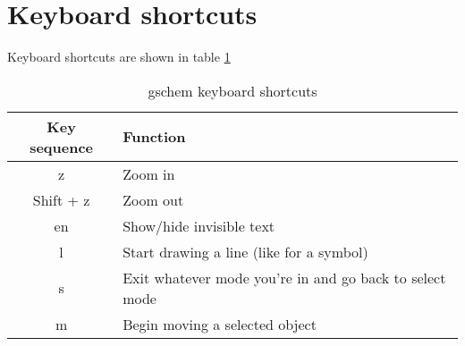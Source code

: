 \section{Keyboard shortcuts}
Keyboard shortcuts are shown in table \ref{shortcuts}

\begin{table}[h]
\begin{center}
\setlength{\extrarowheight}{0.5cm}
\begin{tabular}{cl}

Key sequence	&Function\\
\hline
z		&Zoom in\\
Shift + z	&Zoom out\\
en		&Show/hide invisible text\\
l		&Start drawing a line (like for a symbol)\\
s		&Exit whatever mode you're in and go back to select mode\\
m		&Begin moving a selected object\\

\end{tabular}
\caption{gschem keyboard shortcuts \label{shortcuts}}

\end{center}
\end{table}
